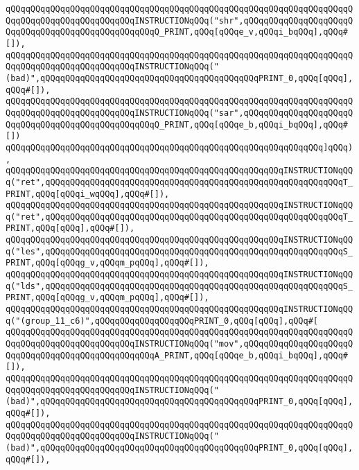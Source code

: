 \verb|qQQqqQQqqQQqqQQqqQQqqQQqqQQqqQQqqQQqqQQqqQQqqQQqqQQqqQQqqQQqqQQqqQQqqQQqqQQqqQQqqQQqqQQqqQQqqQQqINSTRUCTIONqQQq("shr",qQQqqQQqqQQqqQQqqQQqqQQqqQQqqQQqqQQqqQQqqQQqqQQqqQQqQ_PRINT,qQQq[qQQqe_v,qQQqi_bqQQq],qQQq#[]),|\newline
\verb|qQQqqQQqqQQqqQQqqQQqqQQqqQQqqQQqqQQqqQQqqQQqqQQqqQQqqQQqqQQqqQQqqQQqqQQqqQQqqQQqqQQqqQQqqQQqqQQqINSTRUCTIONqQQq("(bad)",qQQqqQQqqQQqqQQqqQQqqQQqqQQqqQQqqQQqqQQqqQQqPRINT_0,qQQq[qQQq],qQQq#[]),|\newline
\verb|qQQqqQQqqQQqqQQqqQQqqQQqqQQqqQQqqQQqqQQqqQQqqQQqqQQqqQQqqQQqqQQqqQQqqQQqqQQqqQQqqQQqqQQqqQQqqQQqINSTRUCTIONqQQq("sar",qQQqqQQqqQQqqQQqqQQqqQQqqQQqqQQqqQQqqQQqqQQqqQQqqQQqQ_PRINT,qQQq[qQQqe_b,qQQqi_bqQQq],qQQq#[])|\newline
\verb|qQQqqQQqqQQqqQQqqQQqqQQqqQQqqQQqqQQqqQQqqQQqqQQqqQQqqQQqqQQqqQQq]qQQq),|\newline
\verb|qQQqqQQqqQQqqQQqqQQqqQQqqQQqqQQqqQQqqQQqqQQqqQQqqQQqqQQqINSTRUCTIONqQQq("ret",qQQqqQQqqQQqqQQqqQQqqQQqqQQqqQQqqQQqqQQqqQQqqQQqqQQqqQQqqQQqT_PRINT,qQQq[qQQqi_wqQQq],qQQq#[]),|\newline
\verb|qQQqqQQqqQQqqQQqqQQqqQQqqQQqqQQqqQQqqQQqqQQqqQQqqQQqqQQqINSTRUCTIONqQQq("ret",qQQqqQQqqQQqqQQqqQQqqQQqqQQqqQQqqQQqqQQqqQQqqQQqqQQqqQQqqQQqT_PRINT,qQQq[qQQq],qQQq#[]),|\newline
\verb|qQQqqQQqqQQqqQQqqQQqqQQqqQQqqQQqqQQqqQQqqQQqqQQqqQQqqQQqINSTRUCTIONqQQq("les",qQQqqQQqqQQqqQQqqQQqqQQqqQQqqQQqqQQqqQQqqQQqqQQqqQQqqQQqqQQqS_PRINT,qQQq[qQQqg_v,qQQqm_pqQQq],qQQq#[]),|\newline
\verb|qQQqqQQqqQQqqQQqqQQqqQQqqQQqqQQqqQQqqQQqqQQqqQQqqQQqqQQqINSTRUCTIONqQQq("lds",qQQqqQQqqQQqqQQqqQQqqQQqqQQqqQQqqQQqqQQqqQQqqQQqqQQqqQQqqQQqS_PRINT,qQQq[qQQqg_v,qQQqm_pqQQq],qQQq#[]),|\newline
\verb|qQQqqQQqqQQqqQQqqQQqqQQqqQQqqQQqqQQqqQQqqQQqqQQqqQQqqQQqINSTRUCTIONqQQq("(group_11_c6)",qQQqqQQqqQQqqQQqqQQqPRINT_0,qQQq[qQQq],qQQq#[|\newline
\verb|qQQqqQQqqQQqqQQqqQQqqQQqqQQqqQQqqQQqqQQqqQQqqQQqqQQqqQQqqQQqqQQqqQQqqQQqqQQqqQQqqQQqqQQqqQQqqQQqINSTRUCTIONqQQq("mov",qQQqqQQqqQQqqQQqqQQqqQQqqQQqqQQqqQQqqQQqqQQqqQQqqQQqA_PRINT,qQQq[qQQqe_b,qQQqi_bqQQq],qQQq#[]),|\newline
\verb|qQQqqQQqqQQqqQQqqQQqqQQqqQQqqQQqqQQqqQQqqQQqqQQqqQQqqQQqqQQqqQQqqQQqqQQqqQQqqQQqqQQqqQQqqQQqqQQqINSTRUCTIONqQQq("(bad)",qQQqqQQqqQQqqQQqqQQqqQQqqQQqqQQqqQQqqQQqqQQqPRINT_0,qQQq[qQQq],qQQq#[]),|\newline
\verb|qQQqqQQqqQQqqQQqqQQqqQQqqQQqqQQqqQQqqQQqqQQqqQQqqQQqqQQqqQQqqQQqqQQqqQQqqQQqqQQqqQQqqQQqqQQqqQQqINSTRUCTIONqQQq("(bad)",qQQqqQQqqQQqqQQqqQQqqQQqqQQqqQQqqQQqqQQqqQQqPRINT_0,qQQq[qQQq],qQQq#[]),|\newline
